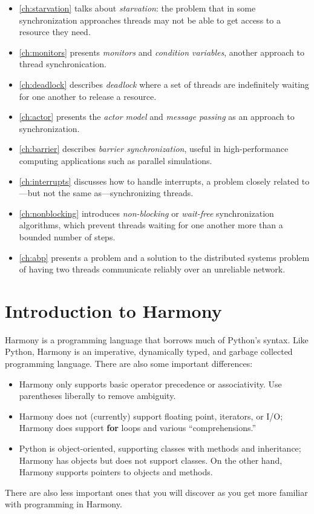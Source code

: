 \documentclass{report}
\begin{document}
\begin{itemize}

\item \autoref{ch:starvation} talks about \emph{starvation}:
the problem that in some
synchronization approaches threads may not be able to get access to a
resource they need.
\item \autoref{ch:monitors} presents
\emph{monitors} and \emph{condition variables},
another approach to thread synchronication.
\item \autoref{ch:deadlock} describes \emph{deadlock}
where a set of threads are indefinitely waiting for one another to
release a resource.
\item \autoref{ch:actor} presents the \emph{actor model}
and \emph{message passing} as an approach to synchronization.
\item \autoref{ch:barrier} describes \emph{barrier synchronization},
useful in high-performance computing applications such as parallel simulations.
\item \autoref{ch:interrupts} discusses how to handle interrupts,
a problem closely related to---but not the same as---synchronizing threads.
\item \autoref{ch:nonblocking} introduces \emph{non-blocking} or
\emph{wait-free} synchronization algorithms,
which prevent threads waiting for one another more than a bounded number of
steps.
\item \autoref{ch:abp} presents a problem and a solution to the distributed
systems problem of having two threads communicate reliably over an unreliable
network.
\end{itemize}

\chapter{Introduction to Harmony}
\label{ch:harmonyintro}

Harmony is a programming language that borrows much of
Python's syntax.
Like Python, Harmony is an imperative,
dynamically typed, and garbage collected programming language.
There are also some important differences:
\begin{itemize}
\item Harmony only supports basic operator precedence or associativity.
Use parentheses liberally to remove ambiguity.
\item Harmony does not (currently) support floating point, iterators, or I/O;
Harmony does support \textbf{for} loops and various ``comprehensions.''
\item Python is object-oriented, supporting classes with methods and
inheritance; Harmony has objects but does not support classes.
On the other hand, Harmony supports pointers to objects and methods.
\end{itemize}
There are also less important ones that you will discover as
you get more familiar with programming in Harmony.
\end{document}
